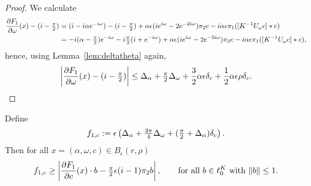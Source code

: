 \begin{proof}
We calculate 
\begin{alignat*}{1}
	\frac{\partial F_1}{\partial \omega} (x) - (i - \tfrac{\pi}{2})  &=
	(i - i\alpha e^{- i \omega}) - (i - \tfrac{\pi}{2}) 
	+ \alpha \epsilon ( i e^{i \omega }- 2 e^{- 2 i \omega}) \pi_2 c -i \alpha \epsilon \pi_1  ([ K^{-1} U_\omega c ] *c )\\
	&= -i (\alpha - \tfrac{\pi}{2}) e^{-i \omega} - i \tfrac{\pi}{2} ( i + e^{-i\omega} )
	+ \alpha \epsilon ( i e^{i \omega }- 2 e^{- 2 i \omega}) \pi_2 c -i \alpha \epsilon \pi_1( [ K^{-1} U_\omega c ] *c) ,
\end{alignat*}
hence, using Lemma~\ref{lem:deltatheta} again,
\begin{equation*}
	\left|  \frac{\partial F_1}{\partial \omega} ( x)- (i- \tfrac{\pi}{2})  \right|  \leq
	\Delta_\alpha +  \tfrac{\pi}{2} \Delta_\omega  + \frac{3}{2} \alpha \epsilon \delta_c +  \frac{1}{2} \alpha \epsilon \rho \delta_c  .
\end{equation*}
\end{proof}



\begin{proposition}
		\label{prop:Z1c}
	Define
	\[
	f_{1,c} := 
	\epsilon \left(  \Delta_\alpha + \tfrac{3 \pi}{4} \Delta_\omega +  (\tfrac{\pi}{2} + \Delta_\alpha ) \delta_c   \right) .
	\]
	Then for all $x= (\alpha,\omega,c) \in B_\epsilon(r,\rho)$
	\[
	f_{1,c} \geq   \left|  \frac{\partial F_1 }{\partial c } (x) \cdot b -  \tfrac{\pi}{2} \epsilon (i-1) \pi_2 b \right|, 
	\qquad\text{for all $b\in\ell^K_0$ with $\|b\| \leq 1$}.
	\]
\end{proposition}



